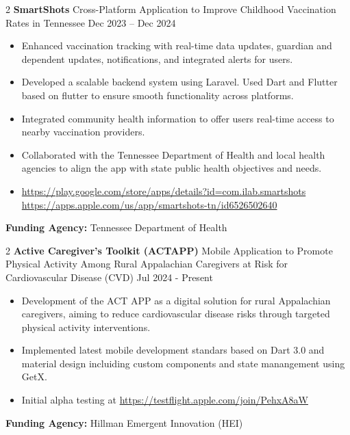 \documentclass[10pt, letterpaper]{article}
\newenvironment{highlights}{
    \begin{itemize}[
        topsep=0.10 cm,
        parsep=0.10 cm,
        partopsep=0pt,
        itemsep=0pt,
        leftmargin=0 cm + 10pt
    ]
}{
    \end{itemize}
} %
\newenvironment{twocolentry}[2][]{
    \onecolentry
    \def\secondColumn{#2}
    \setcolumnwidth{\fill, 4.5 cm}
    \begin{paracol}{2}
}{
    \switchcolumn \raggedleft \secondColumn
    \end{paracol}
    \endonecolentry
} %
\begin{document}
        \vspace{0.3cm} \begin{twocolentry}{Dec 2023 – Dec 2024} \textbf{SmartShots} \textbar Cross-Platform Application to Improve Childhood Vaccination Rates in Tennessee \end{twocolentry} \begin{highlights} 
            \item Enhanced vaccination tracking with real-time data updates, guardian and dependent updates, notifications, and integrated alerts for users. 
            \item Developed a scalable backend system using Laravel. Used Dart and Flutter based on flutter to ensure smooth functionality across platforms. 
            \item Integrated community health information to offer users real-time access to nearby vaccination providers.
             \item Collaborated with the Tennessee Department of Health and local health agencies to align the app with state public health objectives and needs. 
             \item \url{https://play.google.com/store/apps/details?id=com.ilab.smartshots} \url{https://apps.apple.com/us/app/smartshots-tn/id6526502640} \end{highlights} \vspace{0.3cm} \noindent \textbf{Funding Agency:} Tennessee Department of Health
    
    \vspace{0.3cm} \begin{twocolentry}{Jul 2024 - Present} \textbf{Active Caregiver’s Toolkit (ACTAPP)} \textbar Mobile Application to Promote Physical Activity Among Rural Appalachian Caregivers at Risk for Cardiovascular Disease (CVD) \end{twocolentry} \begin{highlights} 
        \item Development of the ACT APP as a digital solution for rural Appalachian caregivers, aiming to reduce cardiovascular disease risks through targeted physical activity interventions. 
        \item Implemented latest mobile development standars based on Dart 3.0 and material design incluiding custom components and state manangement using GetX.
        \item Initial alpha testing at \url{https://testflight.apple.com/join/PehxA8aW}
    \end{highlights} \vspace{0.3cm} \noindent \textbf{Funding Agency:} Hillman Emergent Innovation (HEI)
\end{document}
